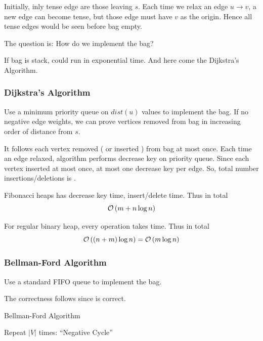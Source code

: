 Initially, inly tense edge are those leaving $s$.
Each time we relax an edge $u \rightarrow v$, a new edge can become tense,
but those edge must have $v$ as the origin.
Hence all tense edges would be seen before bag empty.

The question is: How do we implement the bag?

If bag is stack, could run in exponential time.
And here come the Dijkstra's Algorithm.

\subsubsection{Dijkstra's Algorithm}
Use a minimum priority queue on $dist(u)$ values to implement the bag.
If no negative edge weights, we can prove vertices removed from bag
in increasing order of distance from $s$.

It follows each vertex removed ( or inserted ) from bag at most once.
Each time an edge relaxed, algorithm performs decrease key on priority queue.
Since each vertex inserted at most once, at most one decrease key per edge.
So, total number insertions/deletions is .

Fibonacci heaps has  decrease key time,  insert/delete time.
Thus in total \[\mathcal{O}\left(m + n \log n\right)\]

For regular binary heap, every operation takes  time.
Thus in total \[\mathcal{O}\left((n+m)\log n\right) = \mathcal{O}\left(m \log n\right)\]

\subsubsection{Bellman-Ford Algorithm}
Use a standard FIFO queue to implement the bag.

The correctness follows since  is correct.

\begin{algorithm}[H]
    \caption{Bellman-Ford Algorithm}\label{algo:bellmanford}
    \begin{algorithmic}[1]
            \State{}
            \Loop Repeat $|V|$ times:
                        \State {}
                    \EndIf
                \EndFor
            \EndLoop
                    \Return ``Negative Cycle''
                \EndIf
            \EndFor
        \EndProcedure
    \end{algorithmic}
\end{algorithm}

